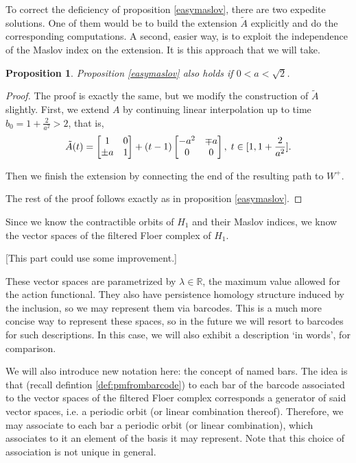\documentclass{article}
\newtheorem{prop}{Proposition}
\theoremstyle{nonumberplain}
\newtheorem{proof}{Proof}
\newcommand{\R}{\mathbb{R}}
\begin{document}
To correct the deficiency of proposition \ref{easymaslov}, there are two expedite solutions. One of them would be to build the extension $\tilde A$ explicitly and do the corresponding computations. A second, easier way, is to exploit the independence of the Maslov index on the extension. It is this approach that we will take.

\begin{prop}
Proposition \ref{easymaslov} also holds if $0 < a < \sqrt2$.
\end{prop}

\begin{proof}
The proof is exactly the same, but we modify the construction of $\tilde A$ slightly. First, we extend $A$ by continuing linear interpolation up to time $b_0 = 1 + \frac2{a^2} > 2$, that is,
\begin{equation}
\tilde A(t) = \begin{bmatrix}
1 & 0\\
\pm a & 1
\end{bmatrix}
+
(t-1)
\begin{bmatrix}
- a^2 &  \mp a\\
0 & 0
\end{bmatrix}, \; t \in \interval1{1+\frac2{a^2}}.
\end{equation}

Then we finish the extension by connecting the end of the resulting path to $W^+$.

The rest of the proof follows exactly as in proposition \ref{easymaslov}.
\end{proof}

Since we know the contractible orbits of $H_1$ and their Maslov indices, we know the vector spaces of the filtered Floer complex of $H_1$.

[This part could use some improvement.]

These vector spaces are parametrized by $\lambda \in \R$, the maximum value allowed for the action functional. They also have persistence homology structure induced by the inclusion, so we may represent them via barcodes. This is a much more concise way to represent these spaces, so in the future we will resort to barcodes for such descriptions. In this case, we will also exhibit a description `in words', for comparison.

We will also introduce new notation here: the concept of named bars. The idea is that (recall defintion \ref{def:pmfrombarcode}) to each bar of the barcode associated to the vector spaces of the filtered Floer complex corresponds a generator of said vector spaces, i.e. a periodic orbit (or linear combination thereof). Therefore, we may associate to each bar a periodic orbit (or linear combination), which associates to it an element of the basis it may represent. Note that this choice of association is not unique in general.
\end{document}
